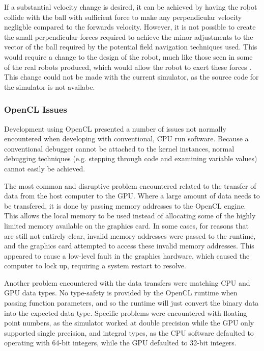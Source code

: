 \documentclass[10pt]{article}
\begin{document}
If a substantial velocity change is desired, it can be achieved by having the
robot collide with the ball with sufficient force to make any perpendicular
velocity negligble compared to the forwards velocity.  However, it is not
possible to create the small perpendicular forces required to achieve the minor
adjustments to the vector of the ball required by the potential field navigation
techniques used. This would require a change to the design of the robot, much
like those seen in some of the real robots produced, which would allow the robot
to exert these forces \cite{aSuitablePaper}.  This change could not be made with
the current simulator, as the source code for the simulator is not availabe.

\subsubsection{OpenCL Issues}

Development using OpenCL presented a number of issues not normally encountered
when developing with conventional, CPU run software.  Because a
conventional debugger cannot be attached to the kernel instances, normal
debugging techniques (e.g. stepping through code and examining variable values)
cannot easily be achieved.

The most common and disruptive problem encountered related to the transfer of
data from the host computer to the GPU.  Where a large amount of data needs
to be transfered, it is done by passing memory addresses to the OpenCL engine. 
This allows the local memory to be used instead of allocating some of the highly
limited memory available on the graphics card.  In some cases, for reasons that
are still not entirely clear, invalid memory addresses were passed to the
runtime, and the graphics card attempted to access these invalid memory
addresses.  This appeared to cause a low-level fault in the graphics hardware,
which caused the computer to lock up, requiring a system restart to resolve.

Another problem encountered with the data transfers were matching CPU and
GPU data types.  No type-safety is provided by the OpenCL runtime when
passing function parameters, and so the runtime will just convert the binary
data into the expected data type.  Specific problems were encountered with
floating point numbers, as the simulator worked at double precision while the
GPU only supported single precision, and integral types, as the CPU
software defaulted to operating with 64-bit integers, while the GPU defaulted to
32-bit integers.
\end{document}
